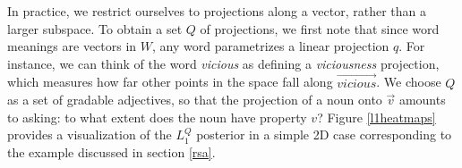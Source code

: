\documentclass[9pt,twocolumn,twoside,lineno]{pnas-new}
\newcommand{\Listener}{L}
\newcommand{\QLONE}{\Listener_{{1}}^{{Q}}}
\begin{document}


		In practice, we restrict ourselves to projections along a vector, rather than a larger subspace. 
		To obtain a set $Q$ of projections, we first note that since word meanings are vectors in $W$, any word parametrizes a linear projection $q$. For instance, we can think of the word \emph{vicious} as defining a \emph{viciousness} projection, which measures how far other points in the space fall along $\overrightarrow{\mathit{vicious}}$. 
		We choose $Q$ as a set of gradable adjectives, so that the projection of a noun onto $\overrightarrow{v}$ amounts to asking: to what extent does the noun have property $v$? 
		Figure \ref{l1heatmaps} provides a visualization of the $\QLONE$ posterior in a simple 2D case corresponding to the example discussed in section \ref{rsa}.
\end{document}

